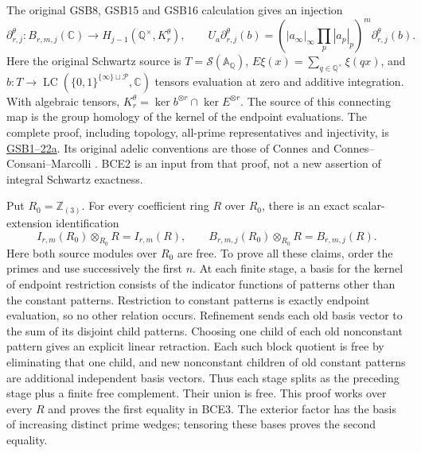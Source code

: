 The original GSB8, GSB15 and GSB16 calculation gives an injection
\begin{equation}\tag{BCE2}
\partial^\theta_{r,j}:B_{r,m,j}(\mathbb C)
 \longrightarrow H_{j-1}(\mathbb Q^\times,K_r^\theta),
\qquad
U_a\partial^\theta_{r,j}(b)
=\left(|a_\infty|_\infty\prod_p|a_p|_p\right)^m
                                  \partial^\theta_{r,j}(b).
\end{equation}
Here the original Schwartz source is \(T=\mathcal S(\mathbb A_\mathbb Q)\),
\(E\xi(x)=\sum_{q\in\mathbb Q^\times}\xi(qx)\), and \(b:T\to
\operatorname{LC}(\{0,1\}^{\{\infty\}\sqcup\mathcal P},\mathbb C)\)
tensors evaluation at zero and additive integration. With algebraic
tensors, \(K_r^\theta=\ker b^{\otimes r}\cap\ker E^{\otimes r}\).
The source of this connecting map is the group homology of the kernel
of the endpoint evaluations. The complete proof, including topology,
all-prime representatives and injectivity, is
\href{https://github.com/KokunoYumeto/zeta-function-research-reader/blob/7bb431df02b42681b3c7335fbf272a3771f777ef/workbenches/splitzero-tandem/research-self-audit/supporting_proofs/GLOBAL_SECONDARY_BOUNDARY_EVALUATION.tex#L1}
{GSB1--22a}. Its original adelic conventions are those of Connes and
Connes--Consani--Marcolli \cite{Connes,CCM}. BCE2 is an input from that
proof, not a new assertion of integral Schwartz exactness.

Put \(R_0=\mathbb Z_{(3)}\). For every coefficient ring \(R\) over
\(R_0\), there is an exact scalar-extension identification
\begin{equation}\tag{BCE3}
I_{r,m}(R_0)\otimes_{R_0}R=I_{r,m}(R),\qquad
B_{r,m,j}(R_0)\otimes_{R_0}R=B_{r,m,j}(R).
\end{equation}
Here both source modules over \(R_0\) are free. To prove all these
claims, order the primes and use successively the first \(n\).
At each finite stage, a basis for the kernel of endpoint restriction
consists of the indicator functions of patterns other than the
constant patterns. Restriction to constant patterns is exactly
endpoint evaluation, so no other relation occurs. Refinement sends
each old basis vector to the sum of its disjoint child patterns.
Choosing one child of each old nonconstant pattern gives an explicit
linear retraction. Each such block quotient is free by eliminating
that one child, and new nonconstant children of old constant patterns
are additional independent basis vectors. Thus each stage splits as
the preceding stage plus a finite free complement. Their union is
free. This proof works over every \(R\) and proves the first equality
in BCE3. The exterior factor has the basis of increasing distinct
prime wedges; tensoring these bases proves the second equality.

